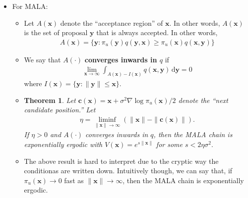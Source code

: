 \documentclass[10pt]{article}
\newtheorem{theorem}[lemma]{Theorem}
\newcommand{\dee}{\mathrm{d}}
\newcommand{\ve}[1]{\mathbf{#1}}
\newcommand{\Real}{\mathbb{R}}
\begin{document}
\begin{itemize}
\begin{itemize}
    \item \begin{theorem}
      A ULA chain on $\Real$ not ergodic and even transient if one of the following conditions hold.
      \begin{itemize}
        \item For some $\alpha > 1$, both $S^+_\alpha$ and $S^-_\alpha$ exist with $S_\alpha^+ < 0$, and $S_\alpha^- > 0$.
        \item For $\alpha = 1$, both $S^+_\alpha$ and $S^-_\alpha$ exist with $S_\alpha^+ < -2$, and $S_\alpha^- > 2$.
      \end{itemize} 
    \end{theorem}
  \end{itemize}

  \item For MALA:
  \begin{itemize}
    \item Let $A(\ve{x})$ denote the ``acceptance region'' of $\ve{x}$. In other words, $A(\ve{x})$ is the set of proposal $\ve{y}$ that is always accepted. In other words,
    \begin{align*}
      A(\ve{x}) = \{ \ve{y} : \pi_u(\ve{y})q(\ve{y},\ve{x}) \geq \pi_u(\ve{x})q(\ve{x},\ve{y}) \}
    \end{align*}

    \item We say that $A(\cdot)$ {\bf converges inwards in $q$} if
    \begin{align*}
      \lim_{\ve{x} \rightarrow \infty} \int_{A(\ve{x}) - I(\ve{x})} q(\ve{x},\ve{y})\, \dee\ve{y} = 0
    \end{align*}
    where $I(\ve{x}) = \{ \ve{y} : \| \ve{y} \| \leq \ve{x} \}$.

    \item \begin{theorem}
      Let $\ve{c}(\ve{x}) = \ve{x} + \sigma^2 \nabla \log \pi_u(\ve{x}) / 2$ denote the ``next candidate position.'' Let
      \begin{align*}
        \eta = \liminf_{\|\ve{x} \| \rightarrow \infty} ( \|\ve{x}\| - \| \ve{c}(\ve{x}) \|).
      \end{align*}
      If $\eta > 0$ and $A(\cdot)$ converges inwards in $q$, then the MALA chain is exponentially ergodic with $V(\ve{x}) = e^{s\|\ve{x} \|}$ for some $s < 2 \eta \sigma^2.$
    \end{theorem}

    \item The above result is hard to interpret due to the cryptic way the conditionas are written down. Intuitively though, we can say that, if $\pi_u(\ve{x}) \rightarrow 0$ fast as $\|\ve{x}\| \rightarrow \infty$, then the MALA chain is exponentially ergodic.
    

\end{itemize}
\end{itemize}
\end{document}
